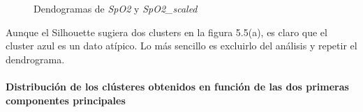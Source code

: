 \begin{figure}[ht]
    \centering
    \hfill
    \caption{Dendogramas de \textit{SpO2} y \textit{SpO2\_scaled}}\label{fig:raw_data_den_spo2}
\end{figure}

{\color{blue} Aunque el Silhouette sugiera dos clusters en la figura 5.5(a), es claro que el cluster azul es un dato atípico. Lo más sencillo es excluirlo del análisis y repetir el dendrograma.}

\paragraph{Distribución de los clústeres obtenidos en función de las dos primeras componentes principales}

